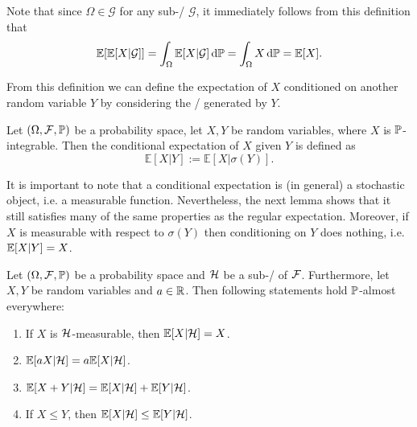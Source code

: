 
Note that since $\Omega \in \mathcal{G}$ for any sub-\sigalg/ $\mathcal{G}$, it immediately follows from this definition that
\begin{equation}\label{eq:law_total_expectation}
	\mathbb E[\mathbb E[X|\mathcal{G}]] = \int_\Omega \mathbb E[X|\mathcal{G}] \, \mathrm{d} \mathbb P = \int_\Omega X \, \mathrm{d} \mathbb P = \mathbb E[X].
\end{equation}

From this definition we can define the expectation of $X$ conditioned on another random variable $Y$ by considering the \sigalg/ generated by $Y$.

\begin{definition}
Let $(\Omega, \mathcal F, \mathbb P)$ be a probability space, let $X,Y$ be random variables, where $X$ is $\mathbb P$-integrable. Then the conditional expectation of $X$ given $Y$ is defined as
\[
\mathbb{E}[X | Y] := \mathbb{E}[ X | \sigma(Y) ].
\]	
\end{definition}


It is important to note that a conditional expectation is (in general) a stochastic object, i.e. a measurable function. Nevertheless, the next lemma shows that it still satisfies many of the same properties as the regular expectation. Moreover, if $X$ is measurable with respect to $\sigma(Y)$ then conditioning on $Y$ does nothing, i.e. $\mathbb E[X|Y] = X$.

\begin{lemma}\label{lem:properties_conditional_expectation}
Let $(\Omega, \mathcal F, \mathbb P)$ be a probability space and $\mathcal H$ be a sub-\sigalg/ of $\mathcal F$. Furthermore, let $X, Y$ be random variables and $a \in \mathbb R$. Then following statements hold $\mathbb P$-almost everywhere:
\begin{enumerate}[label={(\alph*)}]
\item If $X$ is $\mathcal H$-measurable, then $\mathbb E[X | \mathcal H] = X$.
\item $\mathbb E[a X | \mathcal H] = a \mathbb E[X | \mathcal H]$.
\item $\mathbb E[X + Y | \mathcal H] = \mathbb E[X | \mathcal H] + \mathbb E[Y | \mathcal H]$.
\item If $X \le Y$, then $\mathbb E[X | \mathcal H] \le \mathbb E[Y | \mathcal H]$.
\end{enumerate}
\end{lemma}

